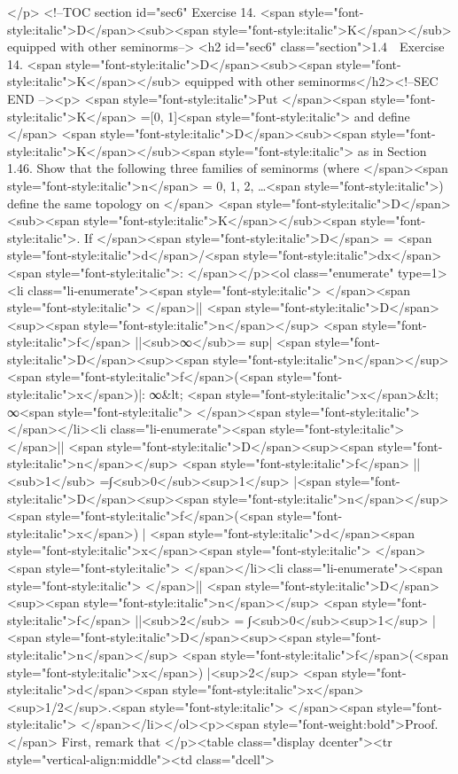 {{{{</p>
<!--TOC section id="sec6" Exercise 14. <span style="font-style:italic">D</span><sub><span style="font-style:italic">K</span></sub> equipped with other seminorms-->
<h2 id="sec6" class="section">1.4  Exercise 14. <span style="font-style:italic">D</span><sub><span style="font-style:italic">K</span></sub> equipped with other seminorms</h2><!--SEC END --><p>
<span style="font-style:italic">Put </span><span style="font-style:italic">K</span> =[0, 1]<span style="font-style:italic"> and define </span> <span style="font-style:italic">D</span><sub><span style="font-style:italic">K</span></sub><span style="font-style:italic"> as in Section 1.46. 
Show that the following three families of seminorms 
(where </span><span style="font-style:italic">n</span> = 0, 1, 2, …<span style="font-style:italic">) define the same topology on </span> <span style="font-style:italic">D</span><sub><span style="font-style:italic">K</span></sub><span style="font-style:italic">. 
If </span><span style="font-style:italic">D</span> = <span style="font-style:italic">d</span>/<span style="font-style:italic">dx</span><span style="font-style:italic">: 
</span></p><ol class="enumerate" type=1><li class="li-enumerate"><span style="font-style:italic">
</span><span style="font-style:italic">
</span>|| <span style="font-style:italic">D</span><sup><span style="font-style:italic">n</span></sup> <span style="font-style:italic">f</span> ||<sub>∞</sub>= sup{| <span style="font-style:italic">D</span><sup><span style="font-style:italic">n</span></sup> <span style="font-style:italic">f</span>(<span style="font-style:italic">x</span>)|: ∞&lt; <span style="font-style:italic">x</span>&lt; ∞}<span style="font-style:italic">
</span><span style="font-style:italic">
</span></li><li class="li-enumerate"><span style="font-style:italic">
</span>|| <span style="font-style:italic">D</span><sup><span style="font-style:italic">n</span></sup> <span style="font-style:italic">f</span> ||<sub>1</sub> =∫<sub>0</sub><sup>1</sup> |<span style="font-style:italic">D</span><sup><span style="font-style:italic">n</span></sup> <span style="font-style:italic">f</span>(<span style="font-style:italic">x</span>) | <span style="font-style:italic">d</span><span style="font-style:italic">x</span><span style="font-style:italic">
</span><span style="font-style:italic">
</span></li><li class="li-enumerate"><span style="font-style:italic">
</span>|| <span style="font-style:italic">D</span><sup><span style="font-style:italic">n</span></sup> <span style="font-style:italic">f</span> ||<sub>2</sub> = {∫<sub>0</sub><sup>1</sup> | <span style="font-style:italic">D</span><sup><span style="font-style:italic">n</span></sup> <span style="font-style:italic">f</span>(<span style="font-style:italic">x</span>) |<sup>2</sup> <span style="font-style:italic">d</span><span style="font-style:italic">x</span> 
}<sup>1/2</sup>.<span style="font-style:italic">
</span><span style="font-style:italic">
</span></li></ol><p><span style="font-weight:bold">Proof.</span> 
First, remark that 
</p><table class="display dcenter"><tr style="vertical-align:middle"><td class="dcell">
     

}}}}

